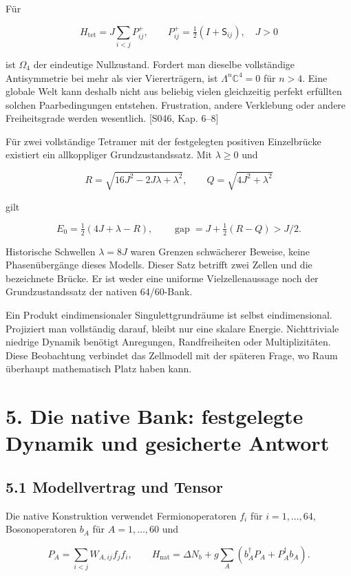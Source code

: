 Für

\[H_{\mathrm{tet}}=J\sum_{i<j}P^+_{ij},\qquad
P^+_{ij}=\tfrac12(I+\mathsf S_{ij}),\quad J>0\]

ist \(\Omega_4\) der eindeutige Nullzustand. Fordert man dieselbe
vollständige Antisymmetrie bei mehr als vier Viererträgern, ist
\(\Lambda^n\mathbb C^4=0\) für \(n>4\). Eine globale Welt kann deshalb
nicht aus beliebig vielen gleichzeitig perfekt erfüllten solchen
Paarbedingungen entstehen. Frustration, andere Verklebung oder andere
Freiheitsgrade werden wesentlich. {[}S046, Kap. 6--8{]}

Für zwei vollständige Tetramer mit der festgelegten positiven
Einzelbrücke existiert ein allkoppliger Grundzustandssatz. Mit
\(\lambda\ge0\) und

\[R=\sqrt{16J^2-2J\lambda+\lambda^2},\qquad
Q=\sqrt{4J^2+\lambda^2}\]

gilt

\[E_0=\tfrac12(4J+\lambda-R),\qquad
\operatorname{gap}=J+\tfrac12(R-Q)>J/2.\]

Historische Schwellen \(\lambda=8J\) waren Grenzen schwächerer Beweise,
keine Phasenübergänge dieses Modells. Dieser Satz betrifft zwei Zellen
und die bezeichnete Brücke. Er ist weder eine uniforme Vielzellenaussage
noch der Grundzustandssatz der nativen 64/60-Bank.

Ein Produkt eindimensionaler Singulettgrundräume ist selbst
eindimensional. Projiziert man vollständig darauf, bleibt nur eine
skalare Energie. Nichttriviale niedrige Dynamik benötigt Anregungen,
Randfreiheiten oder Multiplizitäten. Diese Beobachtung verbindet das
Zellmodell mit der späteren Frage, wo Raum überhaupt mathematisch Platz
haben kann.

\section{5. Die native Bank: festgelegte Dynamik und gesicherte
Antwort}\label{die-native-bank-festgelegte-dynamik-und-gesicherte-antwort}

\subsection{5.1 Modellvertrag und
Tensor}\label{modellvertrag-und-tensor}

Die native Konstruktion verwendet Fermionoperatoren \(f_i\) für
\(i=1,\dots,64\), Bosonoperatoren \(b_A\) für \(A=1,\dots,60\) und

\[
P_A=\sum_{i<j}W_{A,ij}f_jf_i,\qquad
H_{\mathrm{nat}}=\Delta N_b+g\sum_A(b_A^\dagger P_A+P_A^\dagger b_A).
\]

